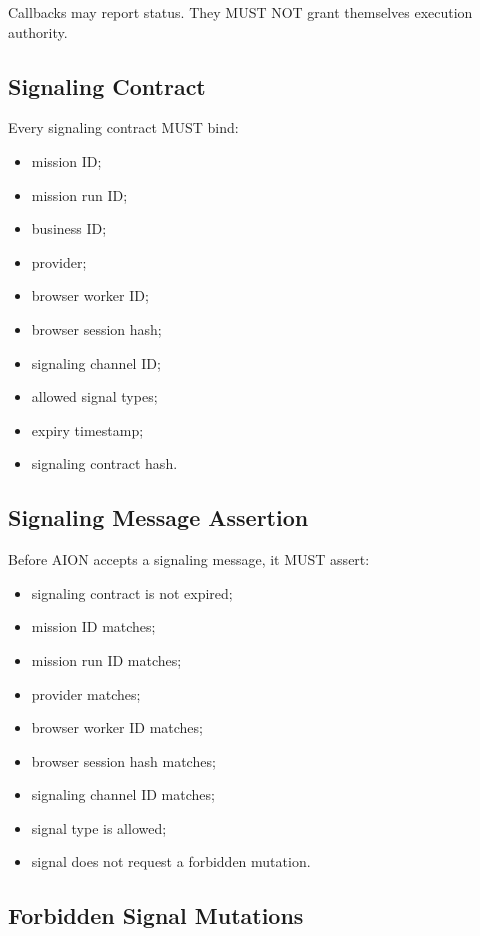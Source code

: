 Callbacks may report status. They MUST NOT grant themselves execution authority.

\subsection{Signaling Contract}

Every signaling contract MUST bind:

\begin{itemize}
  \item mission ID;
  \item mission run ID;
  \item business ID;
  \item provider;
  \item browser worker ID;
  \item browser session hash;
  \item signaling channel ID;
  \item allowed signal types;
  \item expiry timestamp;
  \item signaling contract hash.
\end{itemize}

\subsection{Signaling Message Assertion}

Before AION accepts a signaling message, it MUST assert:

\begin{itemize}
  \item signaling contract is not expired;
  \item mission ID matches;
  \item mission run ID matches;
  \item provider matches;
  \item browser worker ID matches;
  \item browser session hash matches;
  \item signaling channel ID matches;
  \item signal type is allowed;
  \item signal does not request a forbidden mutation.
\end{itemize}

\subsection{Forbidden Signal Mutations}

